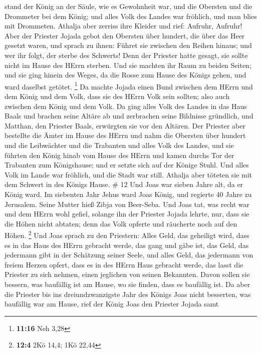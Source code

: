 stand der König an der Säule, wie es Gewohnheit war, und die Obersten
und die Drommeter bei dem König; und alles Volk des Landes war fröhlich,
und man blies mit Drommeten. Athalja aber zerriss ihre Kleider und rief:
Aufruhr, Aufruhr!  Aber der Priester Jojada gebot den
Obersten über hundert, die über das Heer gesetzt waren, und sprach zu
ihnen: Führet sie zwischen den Reihen hinaus; und wer ihr folgt, der
sterbe des Schwerts! Denn der Priester hatte gesagt, sie sollte nicht im
Hause des HErrn sterben.  Und sie machten ihr Raum zu
beiden Seiten; und sie ging hinein des Weges, da die Rosse zum Hause des
Königs gehen, und ward daselbst getötet. \footnote{\textbf{11:16} Neh
  3,28}  Da machte Jojada einen Bund zwischen dem HErrn und
dem König und dem Volk, dass sie des HErrn Volk sein sollten; also auch
zwischen dem König und dem Volk.  Da ging alles Volk des
Landes in das Haus Baals und brachen seine Altäre ab und zerbrachen
seine Bildnisse gründlich, und Matthan, den Priester Baals, erwürgten
sie vor den Altären. Der Priester aber bestellte die Ämter im Hause des
HErrn  und nahm die Obersten über hundert und die
Leibwächter und die Trabanten und alles Volk des Landes, und sie führten
den König hinab vom Hause des HErrn und kamen durchs Tor der Trabanten
zum Königshause; und er setzte sich auf der Könige Stuhl. 
Und alles Volk im Lande war fröhlich, und die Stadt war still. Athalja
aber töteten sie mit dem Schwert in des Königs Hause. \# 12 
Und Joas war sieben Jahre alt, da er König ward.  Im
siebenten Jahr Jehus ward Joas König, und regierte 40 Jahre zu
Jerusalem. Seine Mutter hieß Zibja von Beer-Seba.  Und Joas
tat, was recht war und dem HErrn wohl gefiel, solange ihn der Priester
Jojada lehrte,  nur, dass sie die Höhen nicht abtaten; denn
das Volk opferte und räucherte noch auf den Höhen. \footnote{\textbf{12:4}
  2Kö 14,4; 1Kö 22,44}  Und Joas sprach zu den Priestern:
Alles Geld, das geheiligt wird, dass es in das Haus des HErrn gebracht
werde, das gang und gäbe ist, das Geld, das jedermann gibt in der
Schätzung seiner Seele, und alles Geld, das jedermann von freiem Herzen
opfert, dass es in des HErrn Haus gebracht werde,  das lasst
die Priester zu sich nehmen, einen jeglichen von seinen Bekannten. Davon
sollen sie bessern, was baufällig ist am Hause, wo sie finden, dass es
baufällig ist.  Da aber die Priester bis ins
dreiundzwanzigste Jahr des Königs Joas nicht besserten, was baufällig
war am Hause,  rief der König Joas den Priester Jojada samt
